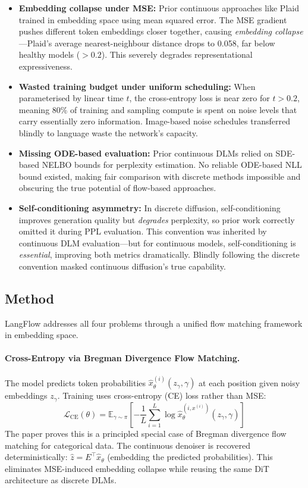 \documentclass[11pt]{article}
\begin{document}
\begin{itemize}
    \item \textbf{Embedding collapse under MSE:} Prior continuous approaches like Plaid~\cite{plaid} trained in embedding space using mean squared error. The MSE gradient pushes different token embeddings closer together, causing \textit{embedding collapse}---Plaid's average nearest-neighbour distance drops to 0.058, far below healthy models ($> 0.2$). This severely degrades representational expressiveness.

    \item \textbf{Wasted training budget under uniform scheduling:} When parameterised by linear time $t$, the cross-entropy loss is near zero for $t > 0.2$, meaning 80\% of training and sampling compute is spent on noise levels that carry essentially zero information. Image-based noise schedules transferred blindly to language waste the network's capacity.

    \item \textbf{Missing ODE-based evaluation:} Prior continuous DLMs relied on SDE-based NELBO bounds for perplexity estimation. No reliable ODE-based NLL bound existed, making fair comparison with discrete methods impossible and obscuring the true potential of flow-based approaches.

    \item \textbf{Self-conditioning asymmetry:} In discrete diffusion, self-conditioning improves generation quality but \textit{degrades} perplexity, so prior work correctly omitted it during PPL evaluation. This convention was inherited by continuous DLM evaluation---but for continuous models, self-conditioning is \textit{essential}, improving both metrics dramatically. Blindly following the discrete convention masked continuous diffusion's true capability.
\end{itemize}

\subsection{Method}

LangFlow addresses all four problems through a unified flow matching framework in embedding space.

\paragraph{Cross-Entropy via Bregman Divergence Flow Matching.}
The model predicts token probabilities $\hat{x}_\theta^{(i)}(z_\gamma, \gamma)$ at each position given noisy embeddings $z_\gamma$. Training uses cross-entropy (CE) loss rather than MSE:
\begin{equation}
    \mathcal{L}_{\mathrm{CE}}(\theta) = \mathbb{E}_{\gamma \sim \pi}\left[-\frac{1}{L}\sum_{i=1}^{L} \log \hat{x}_\theta^{(i, x^{(i)})}(z_\gamma, \gamma)\right]
\end{equation}
The paper proves this is a principled special case of Bregman divergence flow matching for categorical data. The continuous denoiser is recovered deterministically: $\hat{z} = E^\top \hat{x}_\theta$ (embedding the predicted probabilities). This eliminates MSE-induced embedding collapse while reusing the same DiT architecture as discrete DLMs.
\end{document}
